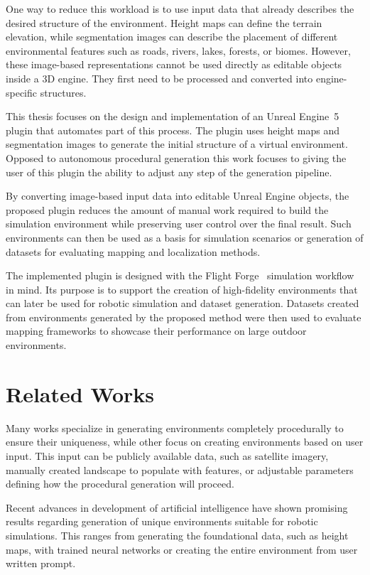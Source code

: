 One way to reduce this workload is to use input data that already describes the desired structure of the environment. Height maps can define the terrain elevation, while segmentation images can describe the placement of different environmental features such as roads, rivers, lakes, forests, or biomes. However, these image-based representations cannot be used directly as editable objects inside a 3D engine. They first need to be processed and converted into engine-specific structures.

This thesis focuses on the design and implementation of an Unreal Engine~5 plugin that automates part of this process. The plugin uses height maps and segmentation images to generate the initial structure of a virtual environment. Opposed to autonomous procedural generation this work focuses to giving the user of this plugin the ability to adjust any step of the generation pipeline. 

By converting image-based input data into editable Unreal Engine objects, the proposed plugin reduces the amount of manual work required to build the simulation environment while preserving user control over the final result. Such environments can then be used as a basis for simulation scenarios or generation of datasets for evaluating mapping and localization methods.

The implemented plugin is designed with the Flight Forge~\cite{bk_flight_forge} simulation workflow in mind. Its purpose is to support the creation of high-fidelity environments that can later be used for robotic simulation and dataset generation. Datasets created from environments generated by the proposed method were then used to evaluate mapping frameworks to showcase their performance on large outdoor environments.

\section{Related Works}

Many works specialize in generating environments completely procedurally to ensure their uniqueness, while other focus on creating environments based on user input. This input can be publicly available data, such as satellite imagery, manually created landscape to populate with features, or adjustable parameters defining how the procedural generation will proceed. 

Recent advances in development of artificial intelligence have shown promising results regarding generation of unique environments suitable for robotic simulations. This ranges from generating the foundational data, such as height maps, with trained neural networks or creating the entire environment from user written prompt.

